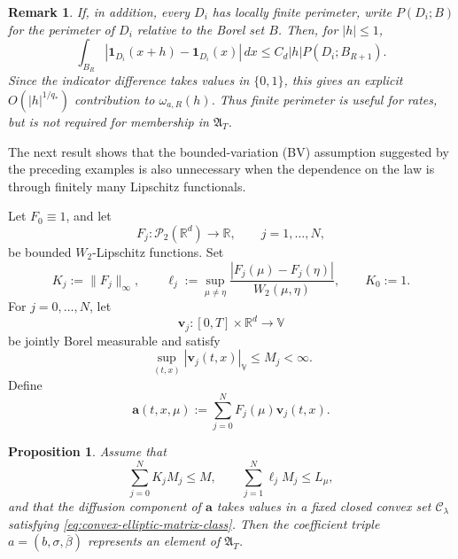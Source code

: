 \documentclass[12pt,oneside, reqno]{amsart}
\newtheorem{remark}[theorem]{Remark}
\newtheorem{proposition}[theorem]{Proposition}
\numberwithin{equation}{section}
\begin{document}
	\begin{remark}
		\label{rem:finite-perimeter-rate}
		If, in addition, every \(D_i\) has locally finite perimeter, write
		\(P(D_i;B)\) for the perimeter of \(D_i\) relative to the Borel set \(B\).
		Then, for
		\(|h|\leq1\),
		\[
		\int_{B_R}
		|\mathbf1_{D_i}(x+h)-\mathbf1_{D_i}(x)|\,dx
		\leq
		C_d|h|P(D_i;B_{R+1}).
		\]
		Since the indicator difference takes values in \(\{0,1\}\), this gives an
		explicit \(O(|h|^{1/q_\ast})\) contribution to
		\(\omega_{a,R}(h)\). Thus finite perimeter is useful for rates, but is not
		required for membership in \(\mathfrak A_T\).
	\end{remark}
	
The next result shows that the bounded-variation (BV) assumption suggested by the preceding examples is also unnecessary when the dependence on the law is through finitely many Lipschitz functionals.

	
		Let \(F_0\equiv1\), and let
	\[
	F_j:\mathcal P_2(\mathbb R^d)\longrightarrow\mathbb R,
	\qquad j=1,\ldots,N,
	\]
	be bounded \(W_2\)-Lipschitz functions. Set
	\[
	K_j:=\|F_j\|_\infty,
	\qquad
	\ell_j:=\sup_{\mu\neq\eta}	\frac{|F_j(\mu)-F_j(\eta)|}	{W_2(\mu,\eta)},
	\qquad
	K_0:=1.
	\]
	For \(j=0,\ldots,N\), let
	\[
	\mathbf v_j:[0,T]\times\mathbb R^d\longrightarrow\mathbb V
	\]
	be jointly Borel measurable and satisfy
	\begin{equation}
		\label{eq:finite-rank-profile-bound}
		\sup_{(t,x)}|\mathbf v_j(t,x)|_{\mathbb V}
		\leq M_j<\infty.
	\end{equation}
	Define
	\begin{equation}
		\label{eq:finite-rank-law-coefficient}
		\mathbf a(t,x,\mu):=\sum_{j=0}^N F_j(\mu)\mathbf v_j(t,x).
	\end{equation}
	
	\begin{proposition}
		\label{prop:finite-rank-measurable-completion}
		Assume that
		\begin{equation}
			\label{eq:finite-rank-structural-bounds}
			\sum_{j=0}^N K_jM_j\leq M,
			\qquad
			\sum_{j=1}^N\ell_jM_j\leq L_\mu,
		\end{equation}
		and that the diffusion component of \(\mathbf a\) takes values in a fixed
		closed convex set \(\mathcal C_\lambda\) satisfying
		\eqref{eq:convex-elliptic-matrix-class}. Then the coefficient triple  \(a=(b,\sigma,\overline\beta)\) represents an element
		of \(\mathfrak A_T\).
	\end{proposition}
	
\end{document}
